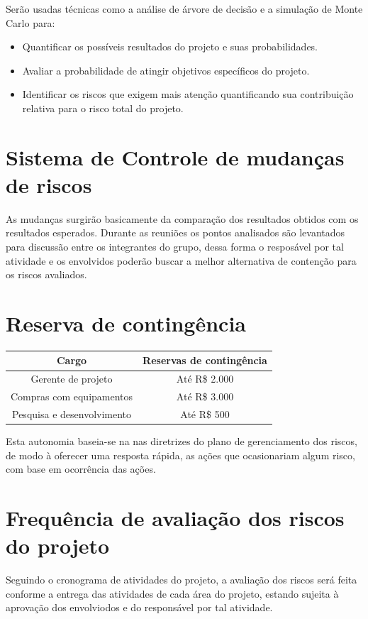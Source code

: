 Serão usadas técnicas como a análise de árvore de decisão e a simulação de Monte Carlo para:
\begin{itemize}
\item Quantificar os possíveis resultados do projeto e suas probabilidades.
\item Avaliar a probabilidade de atingir objetivos específicos do projeto.
\item Identificar os riscos que exigem mais atenção quantificando sua contribuição relativa para o risco total do projeto.

\end{itemize}

\section{Sistema de Controle de mudanças de riscos}
As mudanças surgirão basicamente da comparação dos resultados obtidos com os resultados esperados. Durante as reuniões os pontos analisados são levantados para discussão entre os integrantes do grupo, dessa forma o resposável por tal atividade e os envolvidos poderão buscar a melhor alternativa de contenção para os riscos avaliados. 

\section{Reserva de contingência}
\begin{table}[h]
\centering
\begin{tabular}{|c|c|}
Cargo & Reservas de contingência\\
\hline
Gerente de projeto & Até R\$ 2.000\\
\hline
Compras com equipamentos & Até R\$ 3.000\\
\hline
Pesquisa e desenvolvimento & Até R\$ 500\\
\hline
\end{tabular}
\end{table}

Esta autonomia baseia-se na nas diretrizes do plano de gerenciamento dos riscos, de modo à oferecer uma resposta rápida, as ações que ocasionariam algum risco, com base em ocorrência das ações. 
\section{Frequência de avaliação dos riscos do projeto}
Seguindo o cronograma de atividades do projeto, a avaliação dos riscos será feita conforme a entrega das atividades de cada área do projeto, estando sujeita à aprovação dos envolviodos e do responsável por tal atividade.


